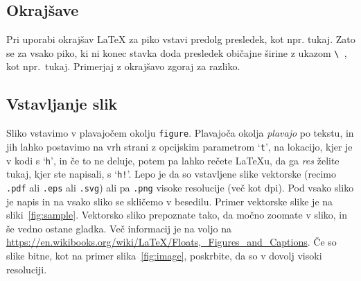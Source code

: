 \subsection{Okrajšave}
Pri uporabi okrajšav \LaTeX{} za piko vstavi predolg presledek, kot npr. tukaj. Zato se za vsako
piko, ki ni konec stavka doda presledek običajne širine z ukazom \verb*|\ |, kot npr.\ tukaj.
Primerjaj z okrajšavo zgoraj za razliko.

\subsection{Vstavljanje slik}
Sliko vstavimo v plavajočem okolju \texttt{figure}. Plavajoča okolja \emph{plavajo} po tekstu, in
jih lahko postavimo na vrh strani z opcijskim parametrom `\texttt{t}', na lokacijo, kjer je v kodi s
`\texttt{h}', in če to ne deluje, potem pa lahko rečete \LaTeX u, da ga \emph{res} želite tukaj,
kjer ste napisali, s `\texttt{h!}'. Lepo je da so vstavljene slike vektorske (recimo \texttt{.pdf}
ali \texttt{.eps} ali \texttt{.svg}) ali pa \texttt{.png} visoke resolucije (več kot
\unit[300]{dpi}).  Pod vsako sliko je napis in na vsako sliko se skličemo v besedilu. Primer
vektorske slike je na sliki~\ref{fig:sample}. Vektorsko sliko prepoznate tako, da močno
zoomate v sliko, in še vedno ostane gladka. Več informacij je na voljo na
\url{https://en.wikibooks.org/wiki/LaTeX/Floats,_Figures_and_Captions}. Če so slike bitne, kot na
primer slika~\ref{fig:image}, poskrbite, da so v dovolj visoki resoluciji.



